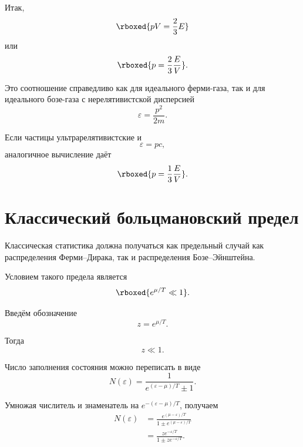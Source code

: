 \documentclass[../final.tex]{subfiles}
\begin{document}
Итак,
%
\[
    \rboxed{
        pV
        =
        \frac{2}{3}E
    }
\]
%
или
%
\[
    \rboxed{
        p
        =
        \frac{2}{3}
        \frac{E}{V}
    }.
\]

Это соотношение справедливо как для идеального ферми-газа,
так и для идеального бозе-газа с нерелятивистской дисперсией
%
\begin{equation*}
    \varepsilon
    =
    \frac{p^2}{2m}.
\end{equation*}

Если частицы ультрарелятивистские и
%
\begin{equation*}
    \varepsilon
    =
    pc,
\end{equation*}
%
аналогичное вычисление даёт
%
\[
    \rboxed{
        p
        =
        \frac{1}{3}
        \frac{E}{V}
    }.
\]


\section{Классический больцмановский предел}

Классическая статистика должна получаться как предельный случай
как распределения Ферми--Дирака, так и распределения Бозе--Эйнштейна.

Условием такого предела является
%
\[
    \rboxed{
        e^{\mu/T}
        \ll
        1
    }.
\]

Введём обозначение
%
\begin{equation*}
    z
    =
    e^{\mu/T}.
\end{equation*}

Тогда
%
\begin{equation*}
    z
    \ll
    1.
\end{equation*}

Число заполнения состояния можно переписать в виде
%
\begin{equation*}
    N(\varepsilon)
    =
    \frac{1}{
        e^{(\varepsilon-\mu)/T}\pm1
    }.
\end{equation*}

Умножая числитель и знаменатель на
$e^{-(\varepsilon-\mu)/T}$, получаем
%
\begin{align*}
    N(\varepsilon)
    &=
    \frac{
        e^{(\mu-\varepsilon)/T}
    }{
        1
        \pm
        e^{(\mu-\varepsilon)/T}
    }
    \\[4pt]
    &=
    \frac{
        ze^{-\varepsilon/T}
    }{
        1
        \pm
        ze^{-\varepsilon/T}
    }.
\end{align*}
\end{document}
